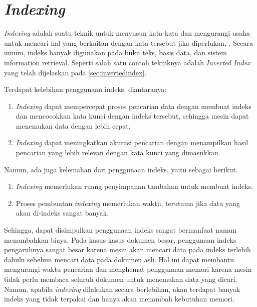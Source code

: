 \section{\textit{Indexing}}
\textit{Indexing} adalah suatu teknik untuk menyusun kata-kata dan mengurangi usaha untuk mencari hal yang berkaitan dengan kata tersebut jika diperlukan, \parencite{database}. Secara umum, indeks banyak digunakan pada buku teks, basis data, dan sistem information retrieval. Seperti salah satu contoh tekniknya adalah \textit{Inverted Index} yang telah dijelaskan pada \ref{sec:invertedindex}.

Terdapat kelebihan penggunaan indeks, diantaranya:
\begin{enumerate}
    \item \textit{Indexing} dapat mempercepat proses pencarian data dengan membuat indeks dan mencocokkan kata kunci dengan indeks tersebut, sehingga mesin dapat menemukan data dengan lebih cepat.
    \item \textit{Indexing} dapat meningkatkan akurasi pencarian dengan menampilkan hasil pencarian yang lebih relevan dengan kata kunci yang dimasukkan.
\end{enumerate}

Namun, ada juga kelemahan dari penggunaan indeks, yaitu sebagai berikut.
\begin{enumerate}
    \item \textit{Indexing} memerlukan ruang penyimpanan tambahan untuk membuat indeks.
    \item Proses pembuatan \textit{indexing} memerlukan waktu, terutama jika data yang akan di-indeks sangat banyak.
\end{enumerate}

Sehingga, dapat disimpulkan penggunaan indeks sangat bermanfaat namun menambahkan biaya.
Pada kasus-kasus dokumen besar, penggunaan indeks pengaruhnya sangat besar karena mesin akan mencari data pada indeks terlebih dahulu sebelum mencari data pada dokumen asli. Hal ini dapat membantu mengurangi waktu pencarian dan menghemat penggunaan memori karena mesin tidak perlu membaca seluruh dokumen untuk menemukan data yang dicari. Namun, apabila \textit{indexing} dilakukan secara berlebihan, akan terdapat banyak indeks yang tidak terpakai dan hanya akan menambah kebutuhan memori.


